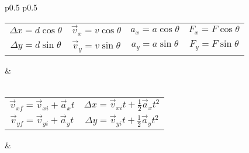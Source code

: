 \begin{longtable}{p{} p{}}
  \vspace{2mm}
  \begin{tabular}{c c c c}
    \(\Delta x = d\cos\theta\) & \(\vec{v}_x = v\cos\theta\) & \(a_x = a\cos\theta\) & \(F_x = F\cos\theta\) \\
    \(\Delta y = d\sin\theta\) & \(\vec{v}_y = v\sin\theta\) & \(a_y = a\sin\theta\) & \(F_y = F\sin\theta\) \\
  \end{tabular} & \\ \\%

	
  \begin{tabular}{c c}
    \(\vec{v}_{xf} = \vec{v}_{xi} + \vec{a}_xt\) & \(\Delta x = \vec{v}_{xi}t + \frac{1}{2}\vec{a}_xt^2\) \\
    \(\vec{v}_{yf} = \vec{v}_{yi} + \vec{a}_yt\) & \(\Delta y = \vec{v}_{yi}t + \frac{1}{2}\vec{a}_yt^2\) \\
  \end{tabular} & \\

\end{longtable}
